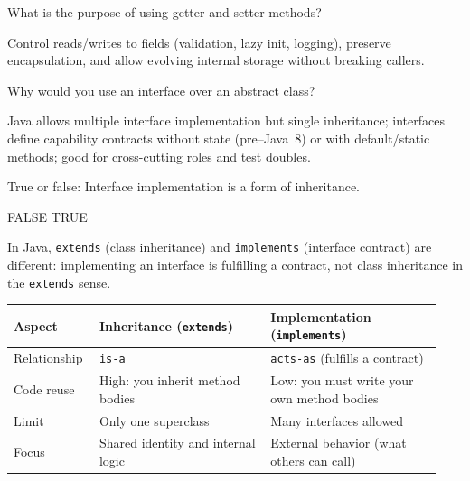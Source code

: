 \question[4]
What is the purpose of using getter and setter methods?
\begin{solutionorbox}[1.25in]
  Control reads/writes to fields (validation, lazy init, logging), preserve encapsulation, and allow evolving internal storage without breaking callers.
\end{solutionorbox}

\newpage


\question[4]
Why would you use an interface over an abstract class?
\begin{solutionorbox}[1.35in]
  Java allows multiple interface implementation but single inheritance; interfaces define capability contracts without state (pre--Java~8) or with default/static methods; good for cross-cutting roles and test doubles.
\end{solutionorbox}

\newpage



\question[4]
True or false: Interface implementation is a form of inheritance.
\begin{choices}
  \CorrectChoice FALSE
  \choice TRUE
\end{choices}
\begin{solution}
  In Java, \texttt{extends} (class inheritance) and \texttt{implements} (interface contract) are different: implementing an interface is fulfilling a contract, not class inheritance in the \texttt{extends} sense.

  \begin{center}
  \small
  \setlength{\tabcolsep}{5pt}
  \begin{tabular}{@{}p{0.18\linewidth}p{0.38\linewidth}p{0.38\linewidth}@{}}
  \hline
  \textbf{Aspect} & \textbf{Inheritance (\texttt{extends})} & \textbf{Implementation (\texttt{implements})} \\
  \hline
  Relationship & \texttt{is-a} & \texttt{acts-as} (fulfills a contract) \\
  Code reuse & High: you inherit method bodies & Low: you must write your own method bodies \\
  Limit & Only one superclass & Many interfaces allowed \\
  Focus & Shared identity and internal logic & External behavior (what others can call) \\
  \hline
  \end{tabular}
  \end{center}
\end{solution}

